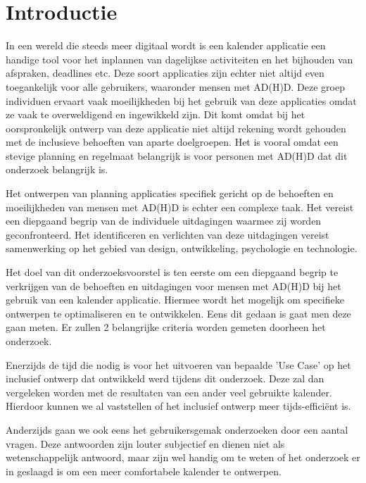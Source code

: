 
\section{Introductie}%
\label{sec:introductie}
In een wereld die steeds meer digitaal wordt is een kalender applicatie een handige tool voor het inplannen van dagelijkse activiteiten en het bijhouden van afspraken, deadlines etc. Deze soort applicaties zijn echter niet altijd even toegankelijk voor alle gebruikers, waaronder mensen met AD(H)D. Deze groep individuen ervaart vaak moeilijkheden bij het gebruik van deze applicaties omdat ze vaak te overweldigend en ingewikkeld zijn. Dit komt omdat bij het oorspronkelijk ontwerp van deze applicatie niet altijd rekening wordt gehouden met de inclusieve behoeften van aparte doelgroepen. Het is vooral omdat een stevige planning en regelmaat belangrijk is voor personen met AD(H)D dat dit onderzoek belangrijk is. \newline 

Het ontwerpen van planning applicaties specifiek gericht op de behoeften en moeilijkheden van mensen met AD(H)D is echter een complexe taak. Het vereist een diepgaand begrip van de individuele uitdagingen waarmee zij worden geconfronteerd. Het identificeren en verlichten van deze uitdagingen vereist samenwerking op het gebied van design, ontwikkeling, psychologie en technologie. \newline 

Het doel van dit onderzoeksvoorstel is ten eerste om een diepgaand begrip te verkrijgen van de behoeften en uitdagingen voor mensen met AD(H)D bij het gebruik van een kalender applicatie. Hiermee wordt het mogelijk om specifieke ontwerpen te optimaliseren en te ontwikkelen. Eens dit gedaan is gaat men deze gaan meten. Er zullen 2 belangrijke criteria worden gemeten doorheen het onderzoek. \newline

Enerzijds de tijd die nodig is voor het uitvoeren van bepaalde 'Use Case' op het inclusief ontwerp dat ontwikkeld werd tijdens dit onderzoek. Deze zal dan vergeleken worden met de resultaten van een ander veel gebruikte kalender. Hierdoor kunnen we al vaststellen of het inclusief ontwerp meer tijds-efficiënt is.  \newline

Anderzijds gaan we ook eens het gebruikersgemak onderzoeken door een aantal vragen. Deze antwoorden zijn louter subjectief en dienen niet als wetenschappelijk antwoord, maar zijn wel handig om te weten of het onderzoek er in geslaagd is om een meer comfortabele kalender te ontwerpen. \newline
 
